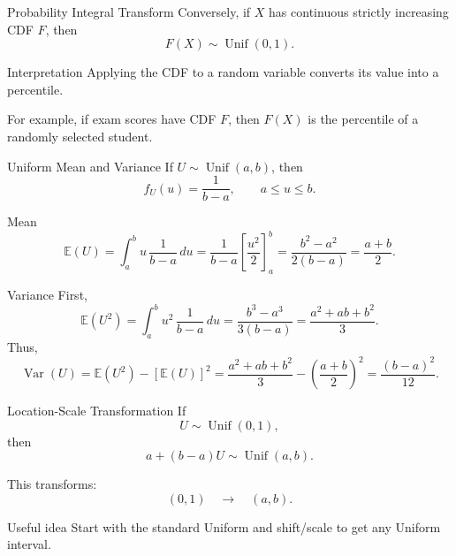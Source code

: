\begin{frame}{Probability Integral Transform}
Conversely, if $X$ has continuous strictly increasing CDF $F$, then
\[
{
F(X)\sim \operatorname{Unif}(0,1).
}
\]

\vspace{0.25cm}

\begin{keybox}{Interpretation}
Applying the CDF to a random variable converts its value into a percentile.
\end{keybox}

\vspace{0.25cm}

For example, if exam scores have CDF $F$, then $F(X)$ is the percentile of a randomly selected student.
\end{frame}
\begin{frame}{Uniform Mean and Variance}
If $U\sim \operatorname{Unif}(a,b)$, then
\[
f_U(u)=\frac{1}{b-a},
\qquad a\le u\le b.
\]

\begin{keybox}{Mean}
\[
\mathbb{E}(U)
=
\int_a^b u\,\frac{1}{b-a}\,du
=
\frac{1}{b-a}\left[\frac{u^2}{2}\right]_a^b
=
\frac{b^2-a^2}{2(b-a)}
=
{\frac{a+b}{2}}.
\]
\end{keybox}

\begin{keybox}{Variance}
First,
\[
\mathbb{E}(U^2)
=
\int_a^b u^2\,\frac{1}{b-a}\,du
=
\frac{b^3-a^3}{3(b-a)}
=
\frac{a^2+ab+b^2}{3}.
\]
Thus,
\[
\operatorname{Var}(U)
=
\mathbb{E}(U^2)-[\mathbb{E}(U)]^2
=
\frac{a^2+ab+b^2}{3}
-
\left(\frac{a+b}{2}\right)^2
=
{\frac{(b-a)^2}{12}}.
\]
\end{keybox}
\end{frame}

\begin{frame}{Location-Scale Transformation}
If
\[
U\sim \operatorname{Unif}(0,1),
\]
then
\[
a+(b-a)U\sim \operatorname{Unif}(a,b).
\]

\vspace{0.25cm}

This transforms:
\[
(0,1)
\quad \longrightarrow \quad
(a,b).
\]

\vspace{0.25cm}

\begin{keybox}{Useful idea}
Start with the standard Uniform and shift/scale to get any Uniform interval.
\end{keybox}
\end{frame}

